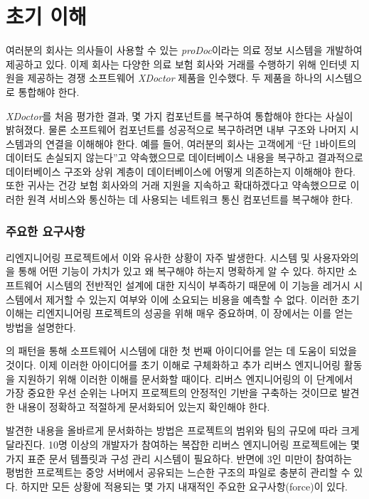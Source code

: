 \documentclass[a4paper,10pt,twoside]{book}
\begin{document}
	\renewcommand{\nnbb}[2]{} %
	\sloppy
\fi
\chapter{초기 이해}

여러분의 회사는 의사들이 사용할 수 있는 \emph{proDoc}이라는 의료 정보 시스템을 개발하여 제공하고 있다. 이제 회사는 다양한 의료 보험 회사와 거래를 수행하기 위해 인터넷 지원을 제공하는 경쟁 소프트웨어 \emph{XDoctor} 제품을 인수했다. 두 제품을 하나의 시스템으로 통합해야 한다.

\emph{XDoctor}를 처음 평가한 결과, 몇 가지 컴포넌트를 복구하여 통합해야 한다는 사실이 밝혀졌다. 물론 소프트웨어 컴포넌트를 성공적으로 복구하려면 내부 구조와 나머지 시스템과의 연결을 이해해야 한다. 예를 들어, 여러분의 회사는 고객에게 ``단 1바이트의 데이터도 손실되지 않는다''고 약속했으므로 데이터베이스 내용을 복구하고 결과적으로 데이터베이스 구조와 상위 계층이 데이터베이스에 어떻게 의존하는지 이해해야 한다. 또한 귀사는 건강 보험 회사와의 거래 지원을 지속하고 확대하겠다고 약속했으므로 이러한 원격 서비스와 통신하는 데 사용되는 네트워크 통신 컴포넌트를 복구해야 한다.

\subsection*{주요한 요구사항}

리엔지니어링 프로젝트에서 이와 유사한 상황이 자주 발생한다. 시스템 및 사용자와의 을 통해 어떤 기능이 가치가 있고 왜 복구해야 하는지 명확하게 알 수 있다. 하지만 소프트웨어 시스템의 전반적인 설계에 대한 지식이 부족하기 때문에 이 기능을 레거시 시스템에서 제거할 수 있는지 여부와 이에 소요되는 비용을 예측할 수 없다. 이러한 초기 이해는 리엔지니어링 프로젝트의 성공을 위해 매우 중요하며, 이 장에서는 이를 얻는 방법을 설명한다.

의 패턴을 통해 소프트웨어 시스템에 대한 첫 번째 아이디어를 얻는 데 도움이 되었을 것이다. 이제 이러한 아이디어를 초기 이해로 구체화하고 추가 리버스 엔지니어링 활동을 지원하기 위해 이러한 이해를 문서화할 때이다. 리버스 엔지니어링의 이 단계에서 가장 중요한 우선 순위는 나머지 프로젝트의 안정적인 기반을 구축하는 것이므로 발견한 내용이 정확하고 적절하게 문서화되어 있는지 확인해야 한다.

발견한 내용을 올바르게 문서화하는 방법은 프로젝트의 범위와 팀의 규모에 따라 크게 달라진다. 10명 이상의 개발자가 참여하는 복잡한 리버스 엔지니어링 프로젝트에는 몇 가지 표준 문서 템플릿과 구성 관리 시스템이 필요하다. 반면에 3인 미만이 참여하는 평범한 프로젝트는 중앙 서버에서 공유되는 느슨한 구조의 파일로 충분히 관리할 수 있다. 하지만 모든 상황에 적용되는 몇 가지 내재적인 주요한 요구사항(force)이 있다.
\end{document}
